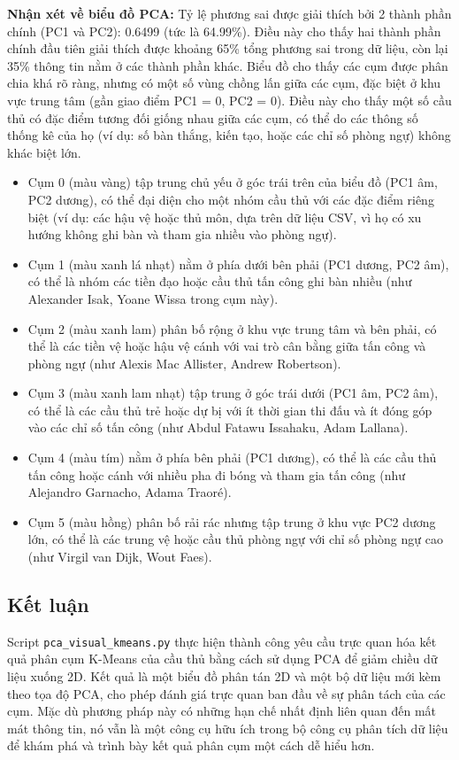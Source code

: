 \documentclass[12pt, a4paper]{report}
\begin{document}
\textbf{Nhận xét về biểu đồ PCA:}
Tỷ lệ phương sai được giải thích bởi 2 thành phần chính (PC1 và PC2): 0.6499 (tức là 64.99\%).
Điều này cho thấy hai thành phần chính đầu tiên giải thích được khoảng 65\% tổng phương sai trong dữ liệu, còn lại 35\% thông tin nằm ở các thành phần khác.
Biểu đồ cho thấy các cụm được phân chia khá rõ ràng, nhưng có một số vùng chồng lấn giữa các cụm, đặc biệt ở khu vực trung tâm (gần giao điểm PC1 = 0, PC2 = 0).
Điều này cho thấy một số cầu thủ có đặc điểm tương đối giống nhau giữa các cụm, có thể do các thông số thống kê của họ (ví dụ: số bàn thắng, kiến tạo, hoặc các chỉ số phòng ngự) không khác biệt lớn.
\begin{itemize}
    \item Cụm 0 (màu vàng) tập trung chủ yếu ở góc trái trên của biểu đồ (PC1 âm, PC2 dương), có thể đại diện cho một nhóm cầu thủ với các đặc điểm riêng biệt (ví dụ: các hậu vệ hoặc thủ môn, dựa trên dữ liệu CSV, vì họ có xu hướng không ghi bàn và tham gia nhiều vào phòng ngự).
    \item Cụm 1 (màu xanh lá nhạt) nằm ở phía dưới bên phải (PC1 dương, PC2 âm), có thể là nhóm các tiền đạo hoặc cầu thủ tấn công ghi bàn nhiều (như Alexander Isak, Yoane Wissa trong cụm này).
    \item Cụm 2 (màu xanh lam) phân bố rộng ở khu vực trung tâm và bên phải, có thể là các tiền vệ hoặc hậu vệ cánh với vai trò cân bằng giữa tấn công và phòng ngự (như Alexis Mac Allister, Andrew Robertson).
    \item Cụm 3 (màu xanh lam nhạt) tập trung ở góc trái dưới (PC1 âm, PC2 âm), có thể là các cầu thủ trẻ hoặc dự bị với ít thời gian thi đấu và ít đóng góp vào các chỉ số tấn công (như Abdul Fatawu Issahaku, Adam Lallana).
    \item Cụm 4 (màu tím) nằm ở phía bên phải (PC1 dương), có thể là các cầu thủ tấn công hoặc cánh với nhiều pha đi bóng và tham gia tấn công (như Alejandro Garnacho, Adama Traoré).
    \item Cụm 5 (màu hồng) phân bố rải rác nhưng tập trung ở khu vực PC2 dương lớn, có thể là các trung vệ hoặc cầu thủ phòng ngự với chỉ số phòng ngự cao (như Virgil van Dijk, Wout Faes).
\end{itemize}

\subsection{Kết luận} %
Script \texttt{pca\_visual\_kmeans.py} thực hiện thành công yêu cầu trực quan hóa kết quả phân cụm K-Means của cầu thủ bằng cách sử dụng PCA để giảm chiều dữ liệu xuống 2D.
Kết quả là một biểu đồ phân tán 2D và một bộ dữ liệu mới kèm theo tọa độ PCA, cho phép đánh giá trực quan ban đầu về sự phân tách của các cụm.
Mặc dù phương pháp này có những hạn chế nhất định liên quan đến mất mát thông tin, nó vẫn là một công cụ hữu ích trong bộ công cụ phân tích dữ liệu để khám phá và trình bày kết quả phân cụm một cách dễ hiểu hơn.
\end{document}
